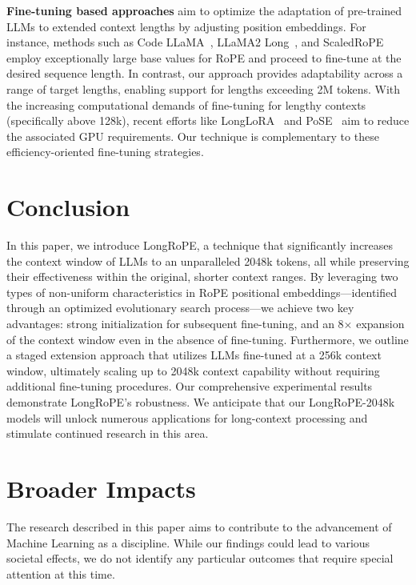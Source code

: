 \textbf{Fine-tuning based approaches} aim to optimize the adaptation of pre-trained LLMs to extended context lengths by adjusting position embeddings. For instance, methods such as Code LLaMA~\cite{codellama}, LLaMA2 Long~\cite{xiong2023effective}, and ScaledRoPE~\cite{liu2023scaling} employ exceptionally large base values for RoPE and proceed to fine-tune at the desired sequence length. In contrast, our approach provides adaptability across a range of target lengths, enabling support for lengths exceeding 2M tokens. With the increasing computational demands of fine-tuning for lengthy contexts (specifically above 128k), recent efforts like LongLoRA~\cite{longlora} and PoSE~\cite{zhu2023pose} aim to reduce the associated GPU requirements. Our technique is complementary to these efficiency-oriented fine-tuning strategies.

\section{Conclusion}

In this paper, we introduce LongRoPE, a technique that significantly increases the context window of LLMs to an unparalleled 2048k tokens, all while preserving their effectiveness within the original, shorter context ranges. By leveraging two types of non-uniform characteristics in RoPE positional embeddings—identified through an optimized evolutionary search process—we achieve two key advantages: strong initialization for subsequent fine-tuning, and an 8$\times$ expansion of the context window even in the absence of fine-tuning. Furthermore, we outline a staged extension approach that utilizes LLMs fine-tuned at a 256k context window, ultimately scaling up to 2048k context capability without requiring additional fine-tuning procedures. Our comprehensive experimental results demonstrate LongRoPE's robustness. We anticipate that our LongRoPE-2048k models will unlock numerous applications for long-context processing and stimulate continued research in this area.

\section*{Broader Impacts} The research described in this paper aims to contribute to the advancement of Machine Learning as a discipline. While our findings could lead to various societal effects, we do not identify any particular outcomes that require special attention at this time.

	\balance

